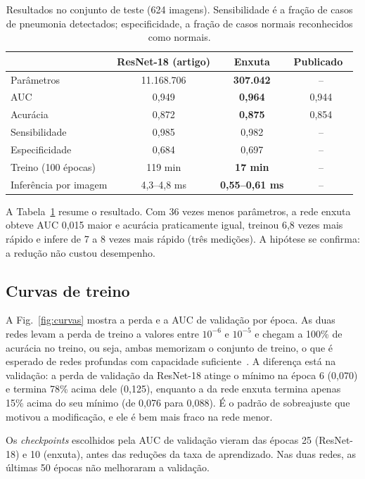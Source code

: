 \documentclass[runningheads]{llncs}
\begin{document}
\begin{table}[htbp]
    \centering
    \caption{Resultados no conjunto de teste (624 imagens). Sensibilidade é
    a fração de casos de pneumonia detectados; especificidade, a fração de
    casos normais reconhecidos como normais.}
    \label{tab:resultados}
    \begin{tabular}{lccc}
        \toprule
        & ResNet-18 (artigo) & Enxuta & Publicado~\cite{medmnistv2} \\
        \midrule
        Parâmetros & 11.168.706 & \textbf{307.042} & -- \\
        AUC & 0,949 & \textbf{0,964} & 0,944 \\
        Acurácia & 0,872 & \textbf{0,875} & 0,854 \\
        Sensibilidade & 0,985 & 0,982 & -- \\
        Especificidade & 0,684 & 0,697 & -- \\
        Treino (100 épocas) & 119 min & \textbf{17 min} & -- \\
        Inferência por imagem & 4,3--4,8 ms & \textbf{0,55--0,61 ms} & -- \\
        \bottomrule
    \end{tabular}
\end{table}

A Tabela~\ref{tab:resultados} resume o resultado. Com 36 vezes menos
parâmetros, a rede enxuta obteve AUC 0,015 maior e acurácia praticamente
igual, treinou 6,8 vezes mais rápido e infere de 7 a 8 vezes mais rápido
(três medições). A hipótese se confirma: a redução não custou desempenho.

\subsection{Curvas de treino}

A Fig.~\ref{fig:curvas} mostra a perda e a AUC de validação por época.
As duas redes levam a perda de treino a valores entre $10^{-6}$ e
$10^{-5}$ e chegam a 100\% de acurácia no treino, ou seja, ambas
memorizam o conjunto de treino, o que é esperado de redes profundas com
capacidade suficiente~\cite{zhang2017}. A diferença está na validação: a
perda de validação da ResNet-18 atinge o mínimo na época 6 (0,070) e
termina 78\% acima dele (0,125), enquanto a da rede enxuta termina apenas
15\% acima do seu mínimo (de 0,076 para 0,088). É o padrão de
sobreajuste que motivou a modificação, e ele é bem mais fraco na rede
menor.

Os \textit{checkpoints} escolhidos pela AUC de validação vieram das
épocas 25 (ResNet-18) e 10 (enxuta), antes das reduções da taxa de
aprendizado. Nas duas redes, as últimas 50 épocas não melhoraram a
validação.
\end{document}
